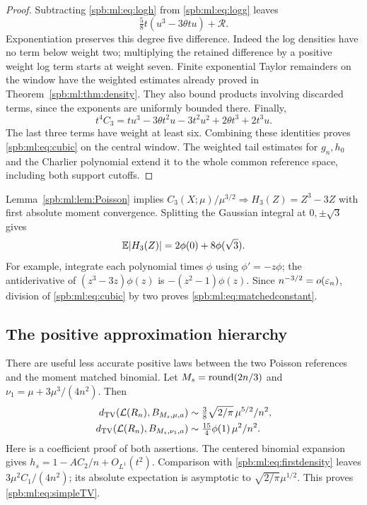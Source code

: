 \begin{proof}
Subtracting \eqref{spb:ml:eq:logh} from \eqref{spb:ml:eq:logg} leaves
\begin{equation}\label{spb:ml:eq:logdiff}
 \tfrac58t(u^3-3\theta t u)+\mathcal R.
\end{equation}
Exponentiation preserves this degree five difference. Indeed the log densities have no term below weight two; multiplying the retained difference by a positive weight log term starts at weight seven. Finite exponential Taylor remainders on the window have the weighted estimates already proved in Theorem~\ref{spb:ml:thm:density}. They also bound products involving discarded terms, since the exponents are uniformly bounded there. Finally,
\begin{equation}\label{spb:ml:eq:C3ident}
 t^4C_3=tu^3-3\theta t^2u-3t^2u^2+2\theta t^3+2t^3u.
\end{equation}
The last three terms have weight at least six. Combining these identities proves \eqref{spb:ml:eq:cubic} on the central window. The weighted tail estimates for $g_n,h_0$ and the Charlier polynomial extend it to the whole common reference space, including both support cutoffs.
\end{proof}

Lemma~\ref{spb:ml:lem:Poisson} implies $C_3(X;\mu)/\mu^{3/2}\Longrightarrow H_3(Z)=Z^3-3Z$ with first absolute moment convergence. Splitting the Gaussian integral at $0,\pm\sqrt3$ gives
\begin{equation}\label{spb:ml:eq:H3norm}
 \mathbb E|H_3(Z)|=2\phi(0)+8\phi(\sqrt3).
\end{equation}
For example, integrate each polynomial times $\phi$ using $\phi'=-z\phi$; the antiderivative of $(z^3-3z)\phi(z)$ is $-(z^2-1)\phi(z)$. Since $n^{-3/2}=o(\varepsilon_n)$, division of \eqref{spb:ml:eq:cubic} by two proves \eqref{spb:ml:eq:matchedconstant}.

\subsection{The positive approximation hierarchy}
There are useful less accurate positive laws between the two Poisson references and the moment matched binomial. Let $M_s=\operatorname{round}(2n/3)$ and $\nu_1=\mu+3\mu^3/(4n^2)$. Then
\begin{align}
 d_{\mathrm{TV}}(\mathcal L(R_n),B_{M_s,\mu,a})
   &\sim\tfrac38\sqrt{2/\pi}\,\mu^{5/2}/n^2,\label{spb:ml:eq:simpleTV}\\
 d_{\mathrm{TV}}(\mathcal L(R_n),B_{M_s,\nu_1,a})
   &\sim\tfrac{15}{4}\phi(1)\,\mu^2/n^2.\label{spb:ml:eq:meanTV}
\end{align}
Here is a coefficient proof of both assertions. The centered binomial expansion gives
$h_s=1-AC_2/n+O_{L^1}(t^2)$. Comparison with \eqref{spb:ml:eq:firstdensity} leaves $3\mu^2C_1/(4n^2)$; its absolute expectation is asymptotic to $\sqrt{2/\pi}\mu^{1/2}$. This proves \eqref{spb:ml:eq:simpleTV}.

